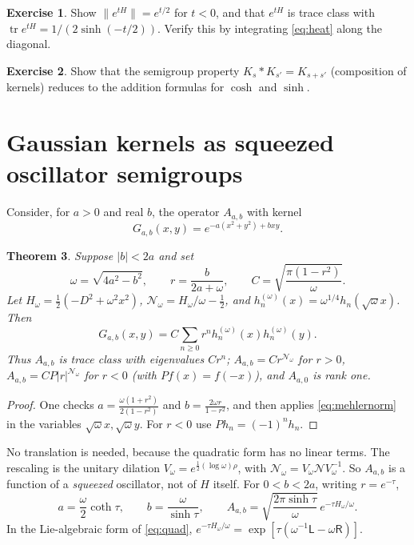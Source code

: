 \documentclass[11pt,reqno]{amsart}
\newtheorem{theorem}{Theorem}[section]
\theoremstyle{definition}
\newtheorem{exercise}[theorem]{Exercise}
\theoremstyle{remark}
\newcommand{\NN}{\mathcal N}
\begin{document}
\begin{exercise}
Show $\|e^{tH}\|=e^{t/2}$ for $t<0$, and that $e^{tH}$ is trace class
with $\operatorname{tr}e^{tH}=1/(2\sinh(-t/2))$. Verify this by
integrating \eqref{eq:heat} along the diagonal.
\end{exercise}
\begin{exercise}
Show that the semigroup property $K_s*K_{s'}=K_{s+s'}$ (composition of
kernels) reduces to the addition formulas for $\cosh$ and $\sinh$.
\end{exercise}

\section{Gaussian kernels as squeezed oscillator semigroups}\label{L:gauss}
Consider, for $a>0$ and real $b$, the operator $A_{a,b}$ with kernel
\[
G_{a,b}(x,y)=e^{-a(x^2+y^2)+bxy}.
\]
\begin{theorem}\label{thm:gauss}
Suppose $|b|<2a$ and set
\[
\omega=\sqrt{4a^2-b^2},\qquad r=\frac{b}{2a+\omega},\qquad
C=\sqrt{\frac{\pi(1-r^2)}{\omega}}.
\]
Let $H_\omega=\frac12(-D^2+\omega^2x^2)$,
$\NN_\omega=H_\omega/\omega-\frac12$, and
$h^{(\omega)}_n(x)=\omega^{1/4}h_n(\sqrt\omega x)$. Then
\[
G_{a,b}(x,y)=C\sum_{n\ge0}r^nh^{(\omega)}_n(x)h^{(\omega)}_n(y).
\]
Thus $A_{a,b}$ is trace class with eigenvalues $Cr^n$;
$A_{a,b}=Cr^{\NN_\omega}$ for $r>0$,
$A_{a,b}=CP|r|^{\NN_\omega}$ for $r<0$ (with $Pf(x)=f(-x)$), and
$A_{a,0}$ is rank one.
\end{theorem}
\begin{proof}
One checks $a=\frac{\omega(1+r^2)}{2(1-r^2)}$ and
$b=\frac{2\omega r}{1-r^2}$, and then applies \eqref{eq:mehlernorm} in
the variables $\sqrt\omega x,\sqrt\omega y$. For $r<0$ use
$Ph_n=(-1)^nh_n$.
\end{proof}
No translation is needed, because the quadratic form has no linear
terms. The rescaling is the unitary dilation
$V_\omega=e^{\frac12(\log\omega)\rho}$, with $\NN_\omega=V_\omega\NN V_\omega^{-1}$.
So $A_{a,b}$ is a function of a \emph{squeezed} oscillator, not of $H$
itself. For $0<b<2a$, writing $r=e^{-\tau}$,
\begin{equation}\label{eq:gaussheat}
a=\frac\omega2\coth\tau,\qquad b=\frac\omega{\sinh\tau},\qquad
A_{a,b}=\sqrt{\frac{2\pi\sinh\tau}{\omega}}\,e^{-\tau H_\omega/\omega}.
\end{equation}
In the Lie-algebraic form of \eqref{eq:quad},
$e^{-\tau H_\omega/\omega}=\exp[\tau(\omega^{-1}\mathsf L-\omega\mathsf R)]$.
\end{document}
